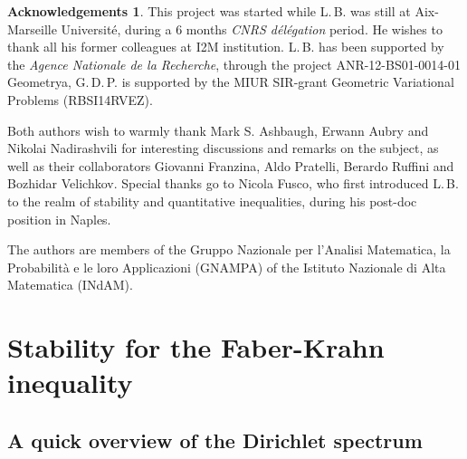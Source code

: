 \documentclass{amsart}
\theoremstyle{definition}
\newtheorem*{ack}{Acknowledgements}
\numberwithin{equation}{section}
\begin{document}
\begin{ack}
This project was started while L.\,B. was still at Aix-Marseille Universit\'e, during a 6 months {\it  CNRS d\'el\'egation} period. He wishes to thank all his former colleagues at I2M institution. L.\,B. has been supported by the {\it Agence Nationale de la Recherche}, through the project ANR-12-BS01-0014-01 {\sc Geometrya}, G.\,D.\,P. is supported by the MIUR SIR-grant {\sc Geometric Variational Problems} (RBSI14RVEZ). 
\par
Both authors wish to warmly thank Mark S. Ashbaugh, Erwann Aubry and Nikolai Nadirashvili for interesting discussions and remarks on the subject, as well as their collaborators Giovanni Franzina, Aldo Pratelli, Berardo Ruffini and Bozhidar Velichkov. Special thanks go to Nicola Fusco, who first introduced L.\,B. to the realm of stability and quantitative inequalities, during his post-doc position in Naples.
\par
The authors are members of the Gruppo Nazionale per l'Analisi Matematica, la Probabilit\`a
e le loro Applicazioni (GNAMPA) of the Istituto Nazionale di Alta Matematica (INdAM).
\end{ack}

\section{Stability for the Faber-Krahn inequality}
\label{sec:2}


\subsection{A quick overview of the Dirichlet spectrum}
\end{document}
